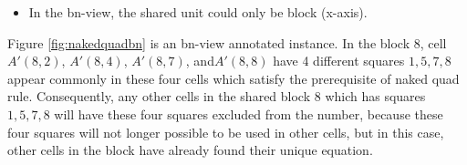 \documentclass[11pt]{report}
\begin{document}
\begin{itemize}
\item In the bn-view, the shared unit could only be block (x-axis).
\end{itemize}

Figure \ref{fig:nakedquadbn} is an bn-view annotated instance. In the block $8$, cell $A'(8,2)$, $A'(8,4)$, $A'(8,7)$, and$A'(8,8)$ have 4 different squares $1, 5, 7, 8$ appear commonly in these four cells which satisfy the prerequisite of naked quad rule. Consequently, any other cells in the shared block $8$ which has squares $1, 5, 7, 8$ will have these four squares excluded from the number, because these four squares will not longer possible to be used in other cells, but in this case, other cells in the block have already found their unique equation.\\
\end{document}
